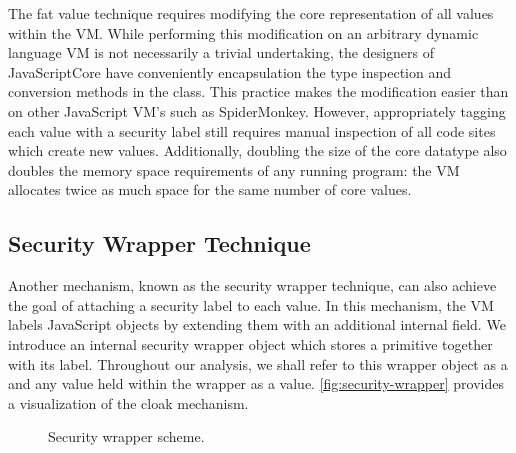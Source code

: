 The fat value technique requires modifying the core representation of all values within the VM.
While performing this modification on an arbitrary dynamic language VM is not necessarily a trivial undertaking, the designers of JavaScriptCore have conveniently encapsulation the type inspection and conversion methods in the  class.
This practice makes the modification easier than on other JavaScript VM's such as SpiderMonkey.
However, appropriately tagging each value with a security label still requires manual inspection of all code sites which create new values.
Additionally, doubling the size of the core datatype also doubles the memory space requirements of any running program: the VM allocates twice as much space for the same number of core values.

\subsection{Security Wrapper Technique}\label{sec:cloaks}

Another mechanism, known as the security wrapper technique, can also achieve the goal of attaching a security label to each value.
In this mechanism, the VM labels JavaScript objects by extending them with an additional internal field.
We introduce an internal security wrapper object which stores a primitive together with its label.
Throughout our analysis, we shall refer to this wrapper object as a  and any value held within the wrapper as a  value.
\autoref{fig:security-wrapper} provides a visualization of the cloak mechanism.

\begin{figure}[h]
 \centering
{}
\caption{Security wrapper scheme.}
\label{fig:security-wrapper}
\end{figure}


